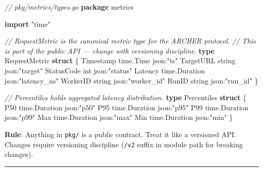 \documentclass[
]{article}
\newenvironment{Shaded}{}{}
\newcommand{\CommentTok}[1]{\textcolor[rgb]{0.38,0.63,0.69}{\textit{#1}}}
\newcommand{\DataTypeTok}[1]{\textcolor[rgb]{0.56,0.13,0.00}{#1}}
\newcommand{\KeywordTok}[1]{\textcolor[rgb]{0.00,0.44,0.13}{\textbf{#1}}}
\newcommand{\NormalTok}[1]{#1}
\newcommand{\OperatorTok}[1]{\textcolor[rgb]{0.40,0.40,0.40}{#1}}
\newcommand{\StringTok}[1]{\textcolor[rgb]{0.25,0.44,0.63}{#1}}
\begin{document}
\begin{Shaded}
\begin{Highlighting}[]
\CommentTok{// pkg/metrics/types.go}
\KeywordTok{package}\NormalTok{ metrics}

\KeywordTok{import} \StringTok{"time"}

\CommentTok{// RequestMetric is the canonical metric type for the ARCHER protocol.}
\CommentTok{// This is part of the public API — change with versioning discipline.}
\KeywordTok{type}\NormalTok{ RequestMetric }\KeywordTok{struct} \OperatorTok{\{}
\NormalTok{    Timestamp  time}\OperatorTok{.}\NormalTok{Time     }\StringTok{\textasciigrave{}json:"ts"\textasciigrave{}}
\NormalTok{    TargetURL  }\DataTypeTok{string}        \StringTok{\textasciigrave{}json:"target"\textasciigrave{}}
\NormalTok{    StatusCode }\DataTypeTok{int}           \StringTok{\textasciigrave{}json:"status"\textasciigrave{}}
\NormalTok{    Latency    time}\OperatorTok{.}\NormalTok{Duration }\StringTok{\textasciigrave{}json:"latency\_ns"\textasciigrave{}}
\NormalTok{    WorkerID   }\DataTypeTok{string}        \StringTok{\textasciigrave{}json:"worker\_id"\textasciigrave{}}
\NormalTok{    RunID      }\DataTypeTok{string}        \StringTok{\textasciigrave{}json:"run\_id"\textasciigrave{}}
\OperatorTok{\}}

\CommentTok{// Percentiles holds aggregated latency distribution.}
\KeywordTok{type}\NormalTok{ Percentiles }\KeywordTok{struct} \OperatorTok{\{}
\NormalTok{    P50 time}\OperatorTok{.}\NormalTok{Duration }\StringTok{\textasciigrave{}json:"p50"\textasciigrave{}}
\NormalTok{    P95 time}\OperatorTok{.}\NormalTok{Duration }\StringTok{\textasciigrave{}json:"p95"\textasciigrave{}}
\NormalTok{    P99 time}\OperatorTok{.}\NormalTok{Duration }\StringTok{\textasciigrave{}json:"p99"\textasciigrave{}}
\NormalTok{    Max time}\OperatorTok{.}\NormalTok{Duration }\StringTok{\textasciigrave{}json:"max"\textasciigrave{}}
\NormalTok{    Min time}\OperatorTok{.}\NormalTok{Duration }\StringTok{\textasciigrave{}json:"min"\textasciigrave{}}
\OperatorTok{\}}
\end{Highlighting}
\end{Shaded}

\textbf{Rule}: Anything in \texttt{pkg/} is a public contract. Treat it
like a versioned API. Changes require versioning discipline
(\texttt{/v2} suffix in module path for breaking changes).

\begin{center}\rule{0.5\linewidth}{0.5pt}\end{center}
\end{document}
